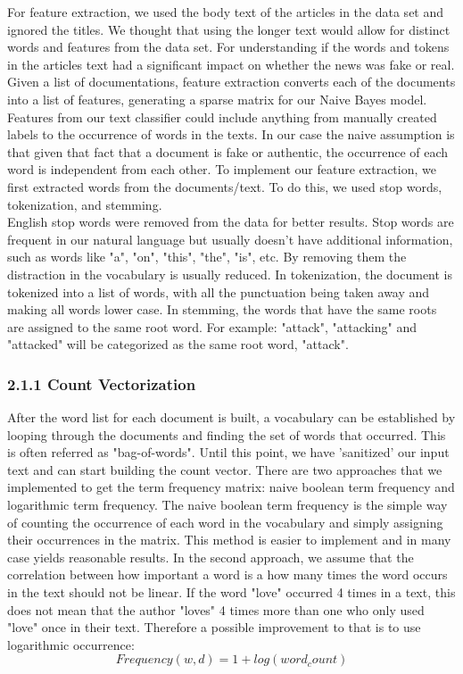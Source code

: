 \documentclass{neu_handout}
\begin{document}
For feature extraction, we used the body text of the articles in the data set and ignored the titles. We thought that using the longer text would allow for distinct words and features from the data set. For understanding if the words and tokens in the articles text had a significant impact on whether the news was fake or real. 
\\
Given a list of documentations, feature extraction converts each of the documents into a list of features, generating a sparse matrix for our Naive Bayes model. Features from our text classifier could include anything from manually created labels to the occurrence of words in the texts. In our case the naive assumption is that given that fact that a document is fake or authentic, the occurrence of each word is independent from each other. To implement our feature extraction, we first extracted words from the documents/text. To do this, we used stop words, tokenization, and stemming.
\\
English stop words were removed from the data for better results. Stop words are frequent in our natural language but usually doesn't have additional information, such as words like "a", "on", "this", "the", "is", etc. By removing them the distraction in the vocabulary is usually reduced. In tokenization, the document is tokenized into a list of words, with all the punctuation being taken away and making all words lower case. In stemming, the words that have the same roots are assigned to the same root word. For example: "attack", "attacking" and "attacked" will be categorized as the same root word, "attack".

\subsubsection*{2.1.1 Count Vectorization}

After the word list for each document is built, a vocabulary can be established by looping through the documents and finding the set of words that occurred. This is often referred as "bag-of-words". Until this point, we have 'sanitized' our input text and can start building the count vector. There are two approaches that we implemented to get the term frequency matrix: naive boolean term frequency and logarithmic term frequency. The naive boolean term frequency is the simple way of counting the occurrence of each word in the vocabulary and simply assigning their occurrences in the matrix. This method is easier to implement and in many case yields reasonable results. In the second approach, we assume that the correlation between how important a word is a how many times the word occurs in the text should not be linear. If the word "love" occurred 4 times in a text, this does not mean that the author "loves" 4 times more than one who only used "love" once in their text. Therefore a possible improvement to that is to use logarithmic occurrence:
$$Frequency(w,d) = 1 + log(word_count)$$
 
\end{document}
